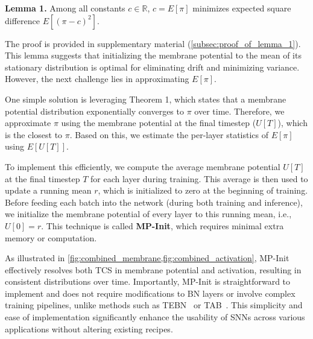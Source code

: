 \textbf{Lemma 1.} Among all constants \( c \in \mathbb{R} \), \( c = E[\pi] \) minimizes expected square difference \(E[(\pi-c)^{2}]\).

The proof is provided in supplementary material (\cref{subsec:proof_of_lemma_1}). This lemma suggests that initializing the membrane potential to the mean of its stationary distribution is optimal for eliminating drift and minimizing variance. However, the next challenge lies in approximating \(E[\pi]\).

One simple solution is leveraging Theorem 1, which states that a membrane potential distribution exponentially converges to \(\pi\) over time. Therefore, we approximate \(\pi\) using the membrane potential at the final timestep (\(U[T]\)), which is the closest to \(\pi\). Based on this, we estimate the per-layer statistics of \(E[\pi]\) using \(E[U[T]]\).

To implement this efficiently, we compute the average membrane potential \(U[T]\) at the final timestep \(T\) for each layer during training. This average is then used to update a running mean \(r\), which is initialized to zero at the beginning of training. Before feeding each batch into the network (during both training and inference), we initialize the membrane potential of every layer to this running mean, i.e., \(U[0] = r\). This technique is called \textbf{MP-Init}, which requires minimal extra memory or computation.

As illustrated in \cref{fig:combined_membrane,fig:combined_activation}, MP-Init effectively resolves both TCS in membrane potential and activation, resulting in consistent distributions over time. Importantly, MP-Init is straightforward to implement and does not require modifications to BN layers or involve complex training pipelines, unlike methods such as TEBN~\cite{tebn:2022} or TAB~\cite{tab:2024}. This simplicity and ease of implementation significantly enhance the usability of SNNs across various applications without altering existing recipes. 
